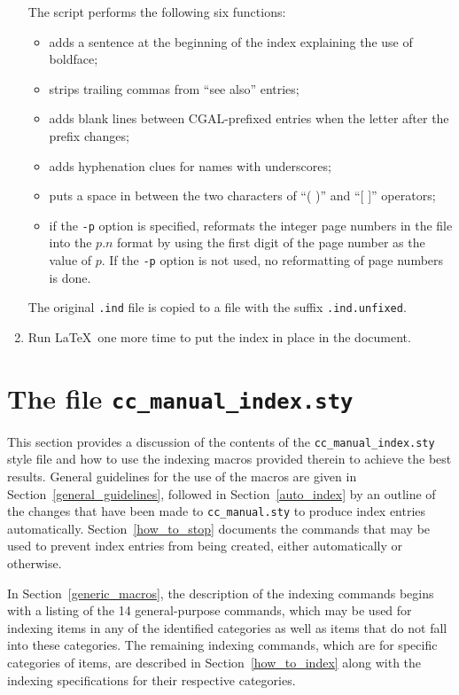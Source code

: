 \documentclass[11pt]{article}
\begin{document}
\begin{enumerate}
         The script performs the following six functions: 
         \begin{itemize}
            \item adds a sentence at the beginning of the index explaining the 
                  use of boldface;
            \item strips trailing commas from ``see also'' entries;
            \item adds blank lines between CGAL-prefixed entries when the
                  letter after the prefix changes;
            \item adds hyphenation clues for names with underscores;
            \item puts a space in between the two characters of ``( )'' and
                  ``[ ]'' operators;
            \item if the {\tt -p} option is specified, reformats the integer
                  page numbers in the file into the $p.n$ format by using the
                  first digit of the page number as the value of $p$.
                  If the {\tt -p} option is not used, no reformatting of page 
                  numbers is done.
         \end{itemize}
         The original \verb|.ind| file is copied to a file with the suffix
         \verb|.ind.unfixed|.
   \item Run \LaTeX\ one more time to put the index in place in the document.
\end{enumerate}


\section{The file {\tt cc\_manual\_index.sty}}
\label{style_file}

This section provides a discussion of the contents of
the \verb|cc_manual_index.sty| style file and how to use the indexing 
macros provided therein to achieve the best results.
General guidelines for the use of the macros are given
in Section~\ref{general_guidelines}, followed in 
Section~\ref{auto_index} by an outline of the changes that have been made
to \verb|cc_manual.sty| to produce index entries automatically. 
Section~\ref{how_to_stop} documents the commands that may be
used to prevent index entries from being created, either automatically
or otherwise.

In Section~\ref{generic_macros}, the description
of the indexing commands begins with a listing of the 14 general-purpose
commands, which may be used for indexing items in any of
the identified categories as well as items that do not fall into these
categories.  The remaining indexing commands, which are for specific
categories of items, are described in Section~\ref{how_to_index} along 
with the indexing specifications for their respective categories.
\end{document}
